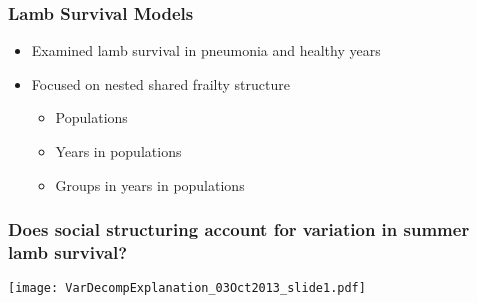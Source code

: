 \documentclass[fleqn,xcolor=table]{beamer}
\begin{document}
\begin{frame}[t]
	\frametitle{\color{darkred} Lamb Survival Models}
	
	\vspace{.2in}
	\begin{itemize}
		\item {\color{navy} Examined lamb survival in pneumonia and
			healthy years}
		\item {\color{navy} Focused on nested shared frailty structure}
			\begin{itemize}
				\item[] \color{navy} Populations
				\item[] \color{navy} Years in populations
				\item[] \color{navy} Groups in years in populations
			\end{itemize}
	\end{itemize}
	\vspace{.2in}

\end{frame}

\begin{frame}[t]
	\frametitle{\color{darkred} Does social structuring account for
	variation in summer lamb survival?}
	\vspace{.2in}

	\texttt{[image: VarDecompExplanation\_03Oct2013\_slide1.pdf]}
%	
%
\end{frame}
\end{document}
